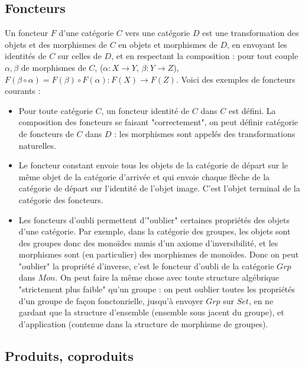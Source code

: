 \documentclass{article}
\begin{document}
\subsection{Foncteurs}

Un foncteur $F$ d'une catégorie $C$ vers une catégorie $D$ est une transformation des objets et des morphismes de $C$ en objets et morphismes de $D$, en envoyant les identités de $C$ sur celles de $D$, et en respectant la composition : pour tout couple $\alpha, \beta$ de morphismes de $C$, ($\alpha : X \rightarrow Y$, $\beta : Y \rightarrow Z$), $F( \beta \circ \alpha) = F(\beta) \circ F(\alpha) : F(X) \rightarrow F(Z) $. Voici des exemples de foncteurs courants : 
\begin{itemize}
    \item Pour toute catégorie $C$, un foncteur identité de $C$ dans $C$ est défini. La composition des foncteurs se faisant "correctement", on peut définir catégorie de foncteurs de $C$ dans $D$ : les morphismes sont appelés des transformations naturelles. 
        \item Le foncteur constant  envoie tous les objets de la catégorie de départ sur le même objet de la catégorie d'arrivée et qui envoie chaque flèche de la catégorie de départ sur l'identité de l'objet image. C'est l'objet terminal de la catégorie des foncteurs.
    \item Les foncteurs d'oubli permettent d'"oublier" certaines propriétés des objets d'une catégorie. Par exemple, dans la catégorie des groupes, les objets sont des groupes donc des monoïdes munis d'un axiome d'inversibilité, et les morphismes sont (en particulier) des morphismes de monoïdes. Donc on peut "oublier" la propriété d'inverse, c'est le foncteur d'oubli de la catégorie $Grp$ dans $Mon$. On peut faire la même chose avec toute structure algébrique "strictement plus faible" qu'un groupe : on peut oublier toutes les propriétés d'un groupe de façon fonctonrielle, jusqu'à envoyer $Grp$ sur $Set$, en ne gardant que la structure d'ensemble (ensemble sous jacent du groupe), et d'application (contenue dans la structure de morphisme de groupes). 
\end{itemize}

\subsection{Produits, coproduits}
\end{document}
